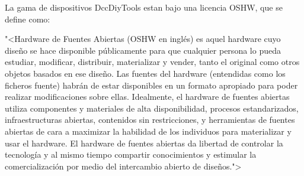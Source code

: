 
La gama de dispositivos DccDiyTools estan bajo una licencia OSHW, que se define como:

"<Hardware de Fuentes Abiertas (OSHW en inglés) es aquel hardware cuyo diseño se hace disponible
públicamente para que cualquier persona lo pueda estudiar, modificar, distribuir, materializar
y vender, tanto el original como otros objetos basados en ese diseño. Las fuentes del hardware
(entendidas como los ficheros fuente) habrán de estar disponibles en un formato apropiado para
poder realizar modificaciones sobre ellas. Idealmente, el hardware de fuentes abiertas utiliza
componentes y materiales de alta disponibilidad, procesos estandarizados, infraestructuras abiertas,
contenidos sin restricciones, y herramientas de fuentes abiertas de cara a maximizar la habilidad
de los individuos para materializar y usar el hardware. El hardware de fuentes abiertas da libertad
de controlar la tecnología y al mismo tiempo compartir conocimientos y estimular la comercialización
por medio del intercambio abierto de diseños.">
